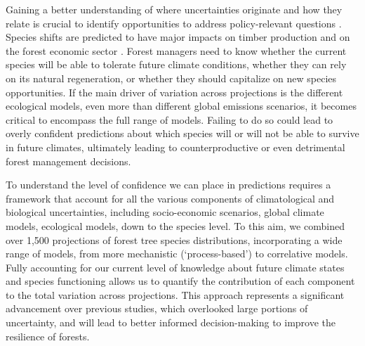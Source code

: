 \documentclass[11pt,letter]{article}
\begin{document}
Gaining a better understanding of where uncertainties originate and how they relate is crucial to identify opportunities 
to address policy-relevant questions \citep{Urban2016, Johnson2024}. Species shifts are predicted to have major impacts on timber production and on the forest economic sector \citep{Wessely2024, Hanewinkel2013}. Forest managers need to know whether the current species will be able to tolerate future climate conditions, whether they can rely on its natural regeneration, or whether they should capitalize on new species opportunities. If the main driver of variation across projections is the different ecological models, even more than different global emissions scenarios, it becomes critical to encompass the full range of models. Failing to do so could lead to overly confident predictions about which species will or will not be able to survive in future climates, ultimately leading to counterproductive or even detrimental forest management decisions.

To understand the level of confidence we can place in predictions requires a framework that account for all the various components of climatological and biological uncertainties, including socio-economic scenarios, global climate models, ecological models, down to the species level. To this aim, we combined over 1,500 projections of forest tree species distributions, incorporating a wide range of models, from more mechanistic (‘process-based’) to correlative models. Fully accounting for our current level of knowledge about future climate states and species functioning allows us to quantify the contribution of each component to the total variation across projections. This approach represents a significant advancement over previous studies, which overlooked large portions of uncertainty, and will lead to better informed decision-making to improve the resilience of forests.

\end{document}
